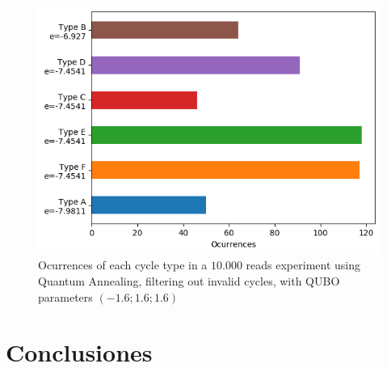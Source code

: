\documentclass[11pt]{article}
\begin{document}
\begin{figure}[H]
	\includegraphics[scale=0.75]{figures/experiment3 (1.6).png}
	\centering
	\caption{Ocurrences of each cycle type in a $10.000$ reads experiment using Quantum Annealing, filtering out invalid cycles, with QUBO parameters $(-1.6; 1.6; 1.6)$}
	\label{fig:exp3-occ2}
\end{figure}


\section{Conclusiones}
\end{document}
